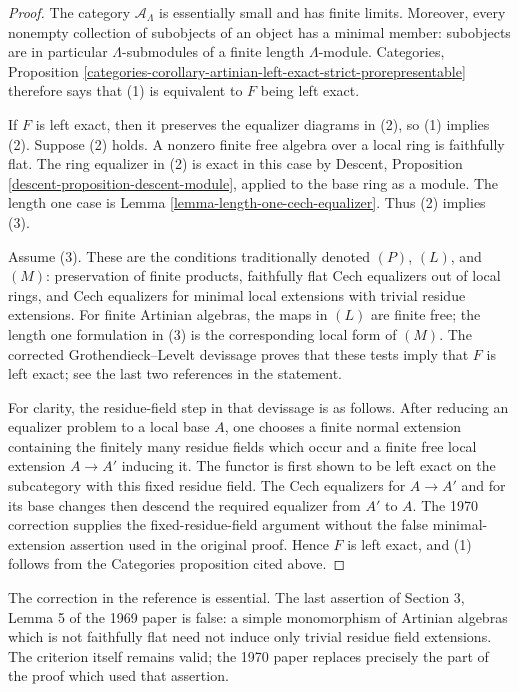 \begin{proof}
The category $\mathcal{A}_\Lambda$ is essentially small and has finite
limits. Moreover, every nonempty collection of subobjects of an object has a
minimal member: subobjects are in particular $\Lambda$-submodules of a finite
length $\Lambda$-module. Categories, Proposition
\ref{categories-corollary-artinian-left-exact-strict-prorepresentable}
therefore says that (1) is equivalent to $F$ being left exact.

If $F$ is left exact, then it preserves the equalizer diagrams in (2), so
(1) implies (2). Suppose (2) holds. A nonzero finite free algebra over a local
ring is faithfully flat. The ring equalizer in (2) is exact in this case by
Descent, Proposition \ref{descent-proposition-descent-module}, applied to the
base ring as a module. The length one case is
Lemma \ref{lemma-length-one-cech-equalizer}. Thus (2) implies (3).

Assume (3). These are the conditions traditionally denoted $(P)$, $(L)$, and
$(M)$: preservation of finite products, faithfully flat Cech equalizers out
of local rings, and Cech equalizers for minimal local extensions with trivial
residue extensions. For finite Artinian algebras, the maps in $(L)$ are finite
free; the length one formulation in (3) is the corresponding local form of
$(M)$. The corrected Grothendieck--Levelt devissage proves that these tests
imply that $F$ is left exact; see the last two references in the statement.

For clarity, the residue-field step in that devissage is as follows. After
reducing an equalizer problem to a local base $A$, one chooses a finite normal
extension containing the finitely many residue fields which occur and a
finite free local extension $A \to A'$ inducing it. The functor is first
shown to be left exact on the subcategory with this fixed residue field. The
Cech equalizers for $A \to A'$ and for its base changes then descend the
required equalizer from $A'$ to $A$. The 1970 correction supplies the
fixed-residue-field argument without the false minimal-extension assertion
used in the original proof. Hence $F$ is left exact, and (1) follows from the
Categories proposition cited above.
\end{proof}

\begin{remark}
\label{remark-levelt-correction}
The correction in the reference is essential. The last assertion of
Section 3, Lemma 5 of the 1969 paper is false: a simple monomorphism of
Artinian algebras which is not faithfully flat need not induce only trivial
residue field extensions. The criterion itself remains valid; the 1970 paper
replaces precisely the part of the proof which used that assertion.
\end{remark}

